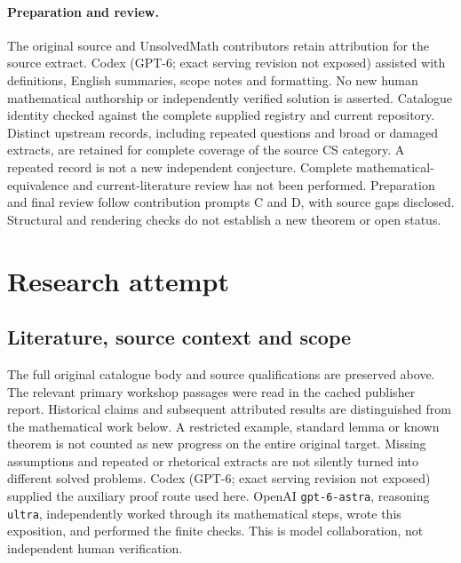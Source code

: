 \documentclass[11pt]{article}
\begin{document}
\paragraph{Preparation and review.}
The original source and UnsolvedMath contributors retain attribution for the source extract. Codex (GPT-6; exact serving revision not exposed) assisted with definitions, English summaries, scope notes and formatting. No new human mathematical authorship or independently verified solution is asserted. Catalogue identity checked against the complete supplied registry and current repository. Distinct upstream records, including repeated questions and broad or damaged extracts, are retained for complete coverage of the source CS category. A repeated record is not a new independent conjecture. Complete mathematical-equivalence and current-literature review has not been performed. Preparation and final review follow contribution prompts C and D, with source gaps disclosed. Structural and rendering checks do not establish a new theorem or open status.
\label{end:statement}

\section{Research attempt}
\subsection{Literature, source context and scope}
The full original catalogue body and source qualifications are preserved above. The relevant primary workshop passages were read in the cached publisher report. Historical claims and subsequent attributed results are distinguished from the mathematical work below. A restricted example, standard lemma or known theorem is not counted as new progress on the entire original target. Missing assumptions and repeated or rhetorical extracts are not silently turned into different solved problems.
Codex (GPT-6; exact serving revision not exposed) supplied the auxiliary proof route used here. OpenAI \texttt{gpt-6-astra}, reasoning \texttt{ultra}, independently worked through its mathematical steps, wrote this exposition, and performed the finite checks. This is model collaboration, not independent human verification.
\end{document}

